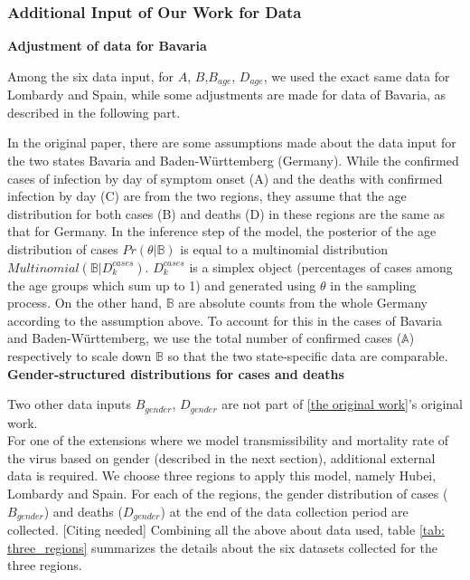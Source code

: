 \documentclass[../main.tex]{subfiles}
\begin{document}
\subsubsection{Additional Input of Our Work for Data}

\textbf{Adjustment of data for Bavaria}

Among the six data input, for $A$, $B$,$B_{age}$, $D_{age}$, we used the exact same data for Lombardy and Spain, while some adjustments are made for data of Bavaria, as described in the following part. 

In the original paper, there are some assumptions made about the data input for the two states Bavaria and Baden-Württemberg (Germany). While the confirmed cases of infection by day of symptom onset (A) and the deaths with confirmed infection by day (C) are from the two regions, they assume that the age distribution for both cases (B) and deaths (D) in these regions are the same as that for Germany. 
In the inference step of the model, the posterior of the age distribution of cases $Pr(\theta|\mathbb{B})$ is equal to a multinomial distribution $Multinomial(\mathbb{B}|D_k^{cases})$. $D_k^{cases}$ is a simplex object (percentages of cases among the age groups which sum up to 1) and generated using $\theta$ in the sampling process. On the other hand, $\mathbb{B}$ are absolute counts from the whole Germany according to the assumption above. To account for this in the cases of Bavaria and Baden-Württemberg, we use the total number of confirmed cases ($\mathbb{A}$) respectively to scale down $\mathbb{B}$ so that the two state-specific data are comparable.\\

\textbf{Gender-structured distributions for cases and deaths}

Two other data inputs $B_{gender}$, $D_{gender}$ are not part of \ref{the original work}'s original work.\\ %

For one of the extensions where we model transmissibility and mortality rate of the virus based on gender (described in the next section), additional external data is required. We choose three regions to apply this model, namely Hubei, Lombardy and Spain. For each of the regions, the gender distribution of cases ($B_{gender}$) and deaths ($D_{gender}$) at the end of the data collection period are collected. [Citing needed] Combining all the above about data used, table \ref{tab: three_regions} summarizes the details about the six datasets collected for the three regions.
\end{document}
